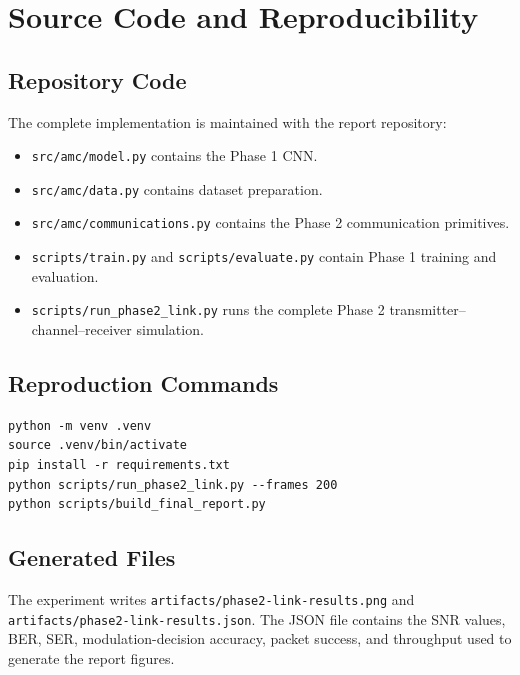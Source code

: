 \chapter{Source Code and Reproducibility}

\section{Repository Code}
The complete implementation is maintained with the report repository:
\begin{itemize}
\item \texttt{src/amc/model.py} contains the Phase 1 CNN.
\item \texttt{src/amc/data.py} contains dataset preparation.
\item \texttt{src/amc/communications.py} contains the Phase 2 communication
      primitives.
\item \texttt{scripts/train.py} and \texttt{scripts/evaluate.py} contain
      Phase 1 training and evaluation.
\item \texttt{scripts/run\_phase2\_link.py} runs the complete Phase 2
      transmitter--channel--receiver simulation.
\end{itemize}

\section{Reproduction Commands}
\begin{verbatim}
python -m venv .venv
source .venv/bin/activate
pip install -r requirements.txt
python scripts/run_phase2_link.py --frames 200
python scripts/build_final_report.py
\end{verbatim}

\section{Generated Files}
The experiment writes \texttt{artifacts/phase2-link-results.png} and
\texttt{artifacts/phase2-link-results.json}. The JSON file contains the SNR
values, BER, SER, modulation-decision accuracy, packet success, and
throughput used to generate the report figures.
